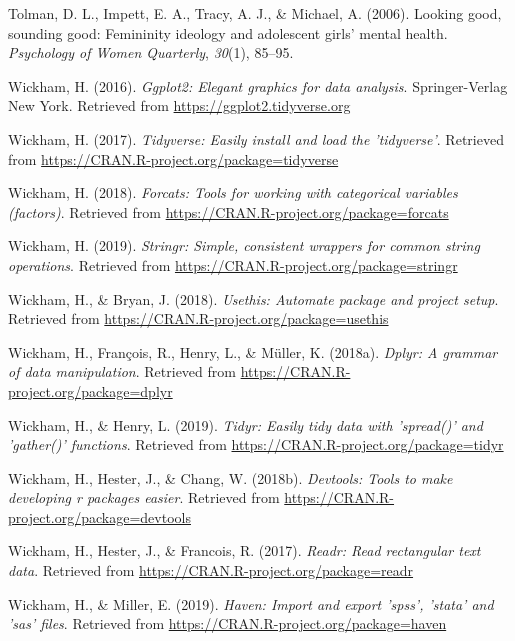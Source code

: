 \documentclass[
  man]{apa6}
\begin{document}
\leavevmode\hypertarget{ref-tolman2006looking}{}%
Tolman, D. L., Impett, E. A., Tracy, A. J., \& Michael, A. (2006). Looking good, sounding good: Femininity ideology and adolescent girls' mental health. \emph{Psychology of Women Quarterly}, \emph{30}(1), 85--95.

\leavevmode\hypertarget{ref-R-ggplot2}{}%
Wickham, H. (2016). \emph{Ggplot2: Elegant graphics for data analysis}. Springer-Verlag New York. Retrieved from \url{https://ggplot2.tidyverse.org}

\leavevmode\hypertarget{ref-R-tidyverse}{}%
Wickham, H. (2017). \emph{Tidyverse: Easily install and load the 'tidyverse'}. Retrieved from \url{https://CRAN.R-project.org/package=tidyverse}

\leavevmode\hypertarget{ref-R-forcats}{}%
Wickham, H. (2018). \emph{Forcats: Tools for working with categorical variables (factors)}. Retrieved from \url{https://CRAN.R-project.org/package=forcats}

\leavevmode\hypertarget{ref-R-stringr}{}%
Wickham, H. (2019). \emph{Stringr: Simple, consistent wrappers for common string operations}. Retrieved from \url{https://CRAN.R-project.org/package=stringr}

\leavevmode\hypertarget{ref-R-usethis}{}%
Wickham, H., \& Bryan, J. (2018). \emph{Usethis: Automate package and project setup}. Retrieved from \url{https://CRAN.R-project.org/package=usethis}

\leavevmode\hypertarget{ref-R-dplyr}{}%
Wickham, H., François, R., Henry, L., \& Müller, K. (2018a). \emph{Dplyr: A grammar of data manipulation}. Retrieved from \url{https://CRAN.R-project.org/package=dplyr}

\leavevmode\hypertarget{ref-R-tidyr}{}%
Wickham, H., \& Henry, L. (2019). \emph{Tidyr: Easily tidy data with 'spread()' and 'gather()' functions}. Retrieved from \url{https://CRAN.R-project.org/package=tidyr}

\leavevmode\hypertarget{ref-R-devtools}{}%
Wickham, H., Hester, J., \& Chang, W. (2018b). \emph{Devtools: Tools to make developing r packages easier}. Retrieved from \url{https://CRAN.R-project.org/package=devtools}

\leavevmode\hypertarget{ref-R-readr}{}%
Wickham, H., Hester, J., \& Francois, R. (2017). \emph{Readr: Read rectangular text data}. Retrieved from \url{https://CRAN.R-project.org/package=readr}

\leavevmode\hypertarget{ref-R-haven}{}%
Wickham, H., \& Miller, E. (2019). \emph{Haven: Import and export 'spss', 'stata' and 'sas' files}. Retrieved from \url{https://CRAN.R-project.org/package=haven}
\end{document}
